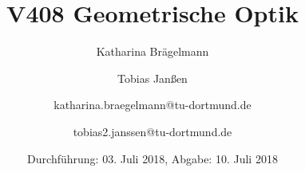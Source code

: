
\title{V408 Geometrische Optik}
\author{Katharina Brägelmann \and Tobias Janßen \and katharina.braegelmann@tu-dortmund.de \and tobias2.janssen@tu-dortmund.de}
\date{Durchführung: 03. Juli 2018, Abgabe: 10. Juli 2018}
\maketitle

\tableofcontents
